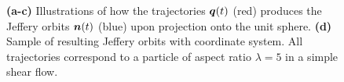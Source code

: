\documentclass[thesis.tex]{subfiles}
\begin{document}
\begin{figure}
\begin{center}
{        }
	\end{center}
    \caption{\textbf{(a-c)} Illustrations of how the trajectories $\mbox{\boldmath$q$}(t)$ (red) produces the Jeffery orbits $\mbox{\boldmath$n$}(t)$ (blue) upon projection onto the unit sphere. \textbf{(d)} Sample of resulting Jeffery orbits with coordinate system. All trajectories correspond to a particle of aspect ratio $\lambda=5$ in a simple shear flow.}\label{fig:projection_orbits}
\end{figure}
\end{document}
